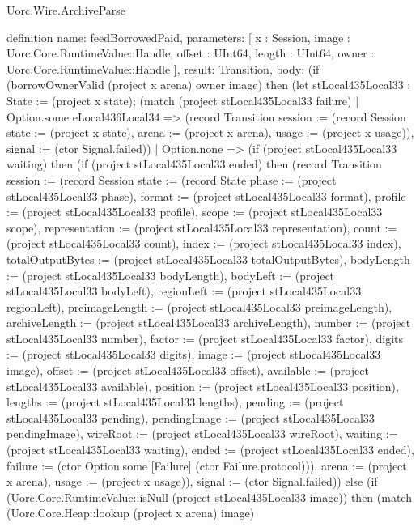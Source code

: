 \begin{lexlean}{Uorc.Wire.ArchiveParse}
\begin{semanticmodule}
definition{
  name: feedBorrowedPaid,
  parameters: [
    x : Session,
    image : Uorc.Core.RuntimeValue::Handle,
    offset : UInt64,
    length : UInt64,
    owner : Uorc.Core.RuntimeValue::Handle
  ],
  result: Transition,
  body: (if (borrowOwnerValid (project x arena) owner image) then (let stLocal435Local33 : State := (project x state); (match (project stLocal435Local33 failure)
    | Option.some eLocal436Local34 => (record Transition {session := (record Session {state := (project x state), arena := (project x arena), usage := (project x usage)}), signal := (ctor Signal.failed)})
    | Option.none => (if (project stLocal435Local33 waiting) then (if (project stLocal435Local33 ended) then (record Transition {session := (record Session {state := (record State {phase := (project stLocal435Local33 phase), format := (project stLocal435Local33 format), profile := (project stLocal435Local33 profile), scope := (project stLocal435Local33 scope), representation := (project stLocal435Local33 representation), count := (project stLocal435Local33 count), index := (project stLocal435Local33 index), totalOutputBytes := (project stLocal435Local33 totalOutputBytes), bodyLength := (project stLocal435Local33 bodyLength), bodyLeft := (project stLocal435Local33 bodyLeft), regionLeft := (project stLocal435Local33 regionLeft), preimageLength := (project stLocal435Local33 preimageLength), archiveLength := (project stLocal435Local33 archiveLength), number := (project stLocal435Local33 number), factor := (project stLocal435Local33 factor), digits := (project stLocal435Local33 digits), image := (project stLocal435Local33 image), offset := (project stLocal435Local33 offset), available := (project stLocal435Local33 available), position := (project stLocal435Local33 position), lengths := (project stLocal435Local33 lengths), pending := (project stLocal435Local33 pending), pendingImage := (project stLocal435Local33 pendingImage), wireRoot := (project stLocal435Local33 wireRoot), waiting := (project stLocal435Local33 waiting), ended := (project stLocal435Local33 ended), failure := (ctor Option.some [Failure] (ctor Failure.protocol))}), arena := (project x arena), usage := (project x usage)}), signal := (ctor Signal.failed)}) else (if (Uorc.Core.RuntimeValue::isNull (project stLocal435Local33 image)) then (match (Uorc.Core.Heap::lookup (project x arena) image)
}
\end{semanticmodule}
\end{lexlean}
